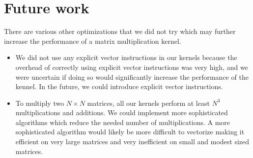 \section{Future work}\label{sec:future}
There are various other optimizations that we did not try which may further
increase the performance of a matrix multiplication kernel.

\begin{itemize}
  \item
    We did not use any explicit vector instructions in our kernels because the
    overhead of correctly using explicit vector instructions was very high, and
    we were uncertain if doing so would significantly increase the performance
    of the kennel. In the future, we could introduce explicit vector
    instructions.

  \item
    To multiply two $N \times N$ matrices, all our kernels perform at least
    $N^3$ multiplications and additions. We could implement more sophisticated
    algorithms which reduce the needed number of multiplications. A more
    sophisticated algorithm would likely be more difficult to vectorize making
    it efficient on very large matrices and very inefficient on small and
    modest sized matrices.
\end{itemize}
